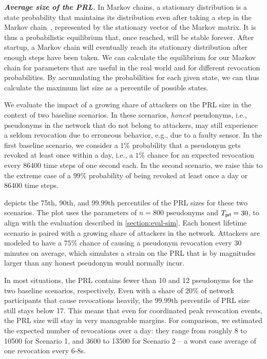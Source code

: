\noindent\textbf{\emph{Average size of the PRL.}}
%
In Markov chains, a stationary distribution is a state probability that
maintains its distribution even after taking a step in the Markov
chain~\cite{hermanns2002markov}, represented by the stationary vector of the
Markov matrix. It is thus a probabilistic equilibrium that, once reached, will
be stable forever.  After startup, a Markov chain will eventually reach its
stationary distribution after enough steps have been taken.  We can calculate
the equilibrium for our Markov chain for parameters that are useful in the real
world and for different revocation probabilities. By accumulating the
probabilities for each given state, we can thus calculate the maximum list size
as a percentile of possible states.

We evaluate the impact of a growing share of attackers on the PRL size in
the context of two baseline scenarios. In these scenarios,
\textit{honest} pseudonyms, i.e., pseudonyms in the network that do not belong
to attackers, may still experience a seldom revocation due to erroneous
behavior, e.g., due to a faulty sensor. In the first baseline scenario, we
consider a $1\%$ probability that a pseudonym gets revoked at least once within
a day, i.e., a $1\%$ chance for an expected revocation every 86400 time steps of
one second each. In the second scenario, we raise this to the extreme case of a
$99\%$ probability of being revoked at least once a day or 86400 time steps.

 depicts the 75th, 90th, and 99.99th percentiles of the
\ac{PRL} sizes for these two scenarios.  The plot uses the parameters of $n=800$
pseudonyms and $\emph{$T_{\mathsf{prl}}$}{}=30$, to align with the evaluation described in
\cref{section:eval-sim}.  Each honest lifetime scenario is paired with a growing
share of attackers in the network. Attackers are modeled to
have a $75\%$ chance of causing a pseudonym revocation every 30 minutes on
average, which simulates a strain on the \ac{PRL} that is by magnitudes larger
than any honest pseudonym would normally incur.

In most situations, the \ac{PRL} contains fewer than 10 and 12
pseudonyms for the two baseline scenarios, respectively. Even
with a share of 20\% of network participants that cause revocations heavily, the
99.99th percentile of \ac{PRL} size still stays below 17. This means that
even for coordinated peak revocation events, the \ac{PRL} size
will stay in very manageable margins. For comparison, we estimated the expected
number of revocations over a day: they range from roughly 8 to 10500 for Scenario
1, and 3600 to 13500 for Scenario 2 -- a worst case average of one revocation
every 6-8s.


